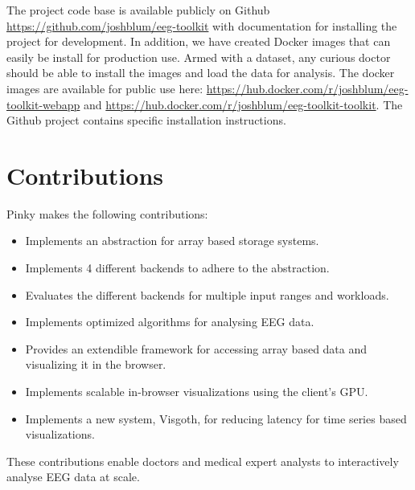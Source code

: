The project code base is available publicly on Github \cite{github}
\url{https://github.com/joshblum/eeg-toolkit} with documentation for installing
the project for development. In addition, we have created Docker \cite{docker}
images that can easily be install for production use. Armed with a dataset, any
curious doctor should be able to install the images and load the data for
analysis. The docker images are available for public use here:
\url{https://hub.docker.com/r/joshblum/eeg-toolkit-webapp} and
\url{https://hub.docker.com/r/joshblum/eeg-toolkit-toolkit}. The Github project
contains specific installation instructions.

\section{Contributions}

Pinky makes the following contributions:

\begin{itemize}

  \item Implements an abstraction for array based storage systems.

  \item Implements 4 different backends to adhere to the abstraction.

  \item Evaluates the different backends for multiple input ranges and
    workloads.

  \item Implements optimized algorithms for analysing EEG data.

  \item Provides an extendible framework for accessing array based data and
    visualizing it in the browser.

  \item Implements scalable in-browser visualizations using the client's GPU.

  \item Implements a new system, Visgoth, for reducing latency for time series
    based visualizations.

\end{itemize}

These contributions enable doctors and medical expert analysts to interactively
analyse EEG data at scale.

